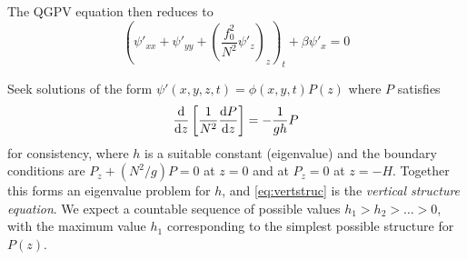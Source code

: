 \documentclass{jknotes}
\begin{document}
The QGPV equation then reduces to
\begin{equation}
	\left( \psi'_{xx} + \psi'_{yy} + (\frac{f_0^2}{N^2}
	\psi'_z)_z\right)_t + \beta \psi'_x = 0
\end{equation}

Seek solutions of the form $\psi'(x,y,z,t) = \phi(x,y,t) P(z)$ where $P$
satisfies
\begin{equation}
	\frac{\diffd}{\diffd z} \left[ \frac{1}{N^2} \frac{\diffd P}{\diffd
	z}\right] = -\frac{1}{gh} P
	\label{eq:vertstruc}
\end{equation}
for consistency, where $h$ is a suitable constant (eigenvalue) and the
boundary conditions are $P_z + (N^2/g)P = 0$ at $z=0$ and at $P_z = 0$ at
$z=-H$. Together this forms an eigenvalue problem for $h$, and
\eqref{eq:vertstruc} is the \emph{vertical structure equation}. We expect
a countable sequence of possible values $h_1 > h_2 > \dots > 0$, with the
maximum value $h_1$ corresponding to the simplest possible structure for
$P(z)$.
\end{document}
